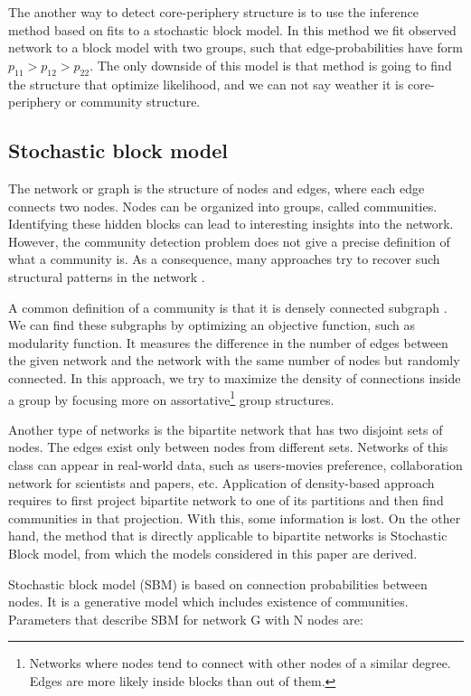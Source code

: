 The another way to detect core-periphery structure is to use the inference method based on fits to a stochastic block model. In this method we fit observed network to a block model with two groups, such that edge-probabilities have form $p_{11}> p_{12} > p_{22}$. The only downside of this model is that method is going to find the structure that optimize likelihood, and we can not say weather it is core-periphery or community structure. 


\subsection{Stochastic block model}
The network or graph is the structure of nodes and edges, where each edge connects two nodes. Nodes can be organized into groups, called communities. Identifying these hidden blocks can lead to interesting insights into the network. However, the community detection problem does not give a precise definition of what a community is. As a consequence, many approaches try to recover such structural patterns in the network \cite{martin}.

A common definition of a community is that it is densely connected subgraph \cite{userguide}. We can find these subgraphs by optimizing an objective function, such as modularity function. It measures the difference in the number of edges between the given network and the network with the same number of nodes but randomly connected. In this approach, we try to maximize the density of connections inside a group by focusing more on assortative\footnote{Networks where nodes tend to connect with other nodes of a similar degree. Edges are more likely inside blocks than out of them.} group structures. 

Another type of networks is the bipartite network that has two disjoint sets of nodes. The edges exist only between nodes from different sets. Networks of this class can appear in real-world data, such as users-movies preference, collaboration network for scientists and papers, etc. Application of density-based approach requires to first project bipartite network to one of its partitions and then find communities in that projection. With this, some information is lost. On the other hand, the method that is directly applicable to bipartite networks is Stochastic Block model, from which the models considered in this paper are derived.

Stochastic block model (SBM) is based on connection probabilities between nodes. It is a generative model which includes existence of communities. Parameters that describe SBM for network G with N nodes are:

